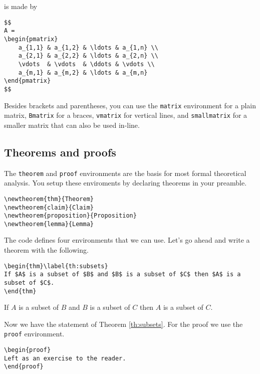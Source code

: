 is made by

\begin{lstlisting}
$$
A =
\begin{pmatrix}
	a_{1,1}	& a_{1,2} & \ldots & a_{1,n} \\
	a_{2,1} & a_{2,2} & \ldots & a_{2,n} \\
	\vdots 	& \vdots  & \ddots & \vdots \\
	a_{m,1} & a_{m,2} & \ldots & a_{m,n} 
\end{pmatrix}
$$
\end{lstlisting}

Besides brackets and parentheses, you can use the \texttt{matrix} environment for a plain matrix, \texttt{Bmatrix}  for a braces, \texttt{vmatrix} for vertical lines, and \texttt{smallmatrix} for a smaller matrix that can also be used in-line.

\subsection{Theorems and proofs}

The \texttt{theorem} and \texttt{proof} environments are the basis for most formal theoretical analysis. You setup these enviroments by declaring theorems in your preamble. 

\begin{lstlisting}
\newtheorem{thm}{Theorem}
\newtheorem{claim}{Claim}
\newtheorem{proposition}{Proposition}
\newtheorem{lemma}{Lemma}
\end{lstlisting}

The code defines four environments that we can use. Let's go ahead and write a theorem with the following.

\begin{lstlisting}
\begin{thm}\label{th:subsets}
If $A$ is a subset of $B$ and $B$ is a subset of $C$ then $A$ is a subset of $C$.
\end{thm}
\end{lstlisting}

\begin{thm}\label{th:subsets}
If $A$ is a subset of $B$ and $B$ is a subset of $C$ then $A$ is a subset
of $C$.
\end{thm}

Now we have the statement of Theorem \ref{th:subsets}. For the proof we use the \texttt{proof} environment.

\begin{lstlisting}
\begin{proof}
Left as an exercise to the reader.
\end{proof}
\end{lstlisting}

